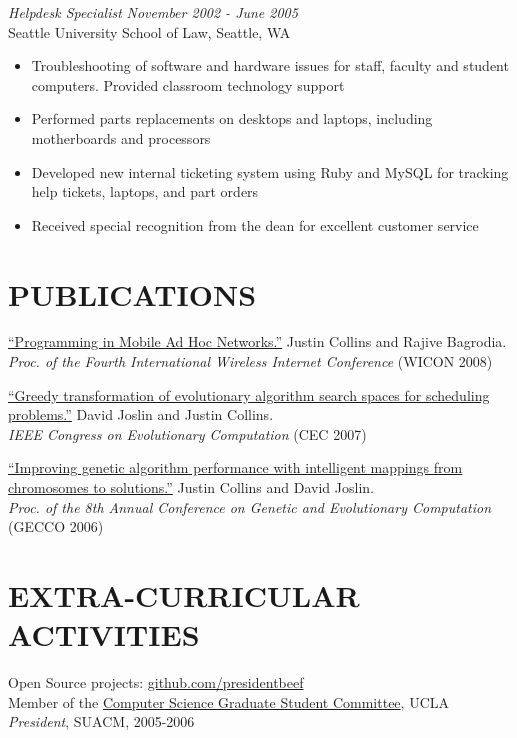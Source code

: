 \documentclass[margin]{res}
\begin{document}
\begin{resume}
{\sl Helpdesk Specialist} \hfill \textit{November 2002 - June 2005} \\
		Seattle University School of Law, Seattle, WA 
		\begin{itemize}  \itemsep -2pt %
		\item Troubleshooting of software and hardware issues for staff, faculty and student computers. Provided classroom technology support
		\item Performed parts replacements on desktops and laptops, including motherboards and processors
		\item Developed new internal ticketing system using Ruby and MySQL for tracking help tickets, laptops, and part orders
		\item Received special recognition from the dean for excellent customer service
		\end{itemize}

		\section{PUBLICATIONS}
		\href{http://cs.ucla.edu/~collins/documents/Justin_Collins-WICON08.pdf}{``Programming in Mobile Ad Hoc Networks.''} Justin Collins and Rajive Bagrodia. \\
{\it Proc. of the Fourth International Wireless Internet Conference} (WICON 2008)

\href{http://cs.ucla.edu/~collins/documents/Joslin_Collins-Greedy_Transformations_of_Search_Spaces.pdf}{``Greedy transformation of evolutionary algorithm search spaces for scheduling problems.''} David Joslin and Justin Collins.\\
{\it IEEE Congress on Evolutionary Computation} (CEC 2007)

\href{http://cs.ucla.edu/~collins/documents/Collins_Joslin-GECCO06-abstract.pdf}{``Improving genetic algorithm performance with intelligent mappings from chromosomes to solutions.''} Justin Collins and David Joslin. \\
{\it Proc. of the 8th Annual Conference on Genetic and Evolutionary Computation} (GECCO 2006)

\section{EXTRA-CURRICULAR \\ ACTIVITIES}             
Open Source projects: \href{http://github.com/presidentbeef}{github.com/presidentbeef}\\
			 Member of the \href{http://csgsc.cs.ucla.edu/}{Computer Science Graduate Student Committee}, UCLA \\
{\it President}, SUACM, 2005-2006

\end{resume}
\end{document}
